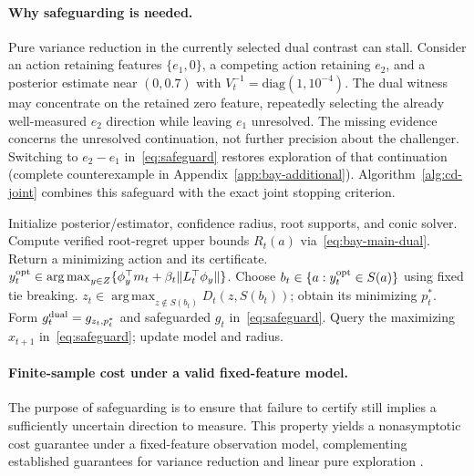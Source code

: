 \documentclass{article}
\theoremstyle{plain}
\theoremstyle{definition}
\DeclareMathOperator*{\argmax}{arg\,max}
\begin{document}
\paragraph{Why safeguarding is needed.}
Pure variance reduction in the currently selected dual contrast
can stall. Consider an action retaining features $\{e_1,0\}$,
a competing action retaining $e_2$, and a posterior estimate
near $(0,0.7)$ with $V_t^{-1}=\mathrm{diag}(1,10^{-4})$.
The dual witness may concentrate on the retained zero feature,
repeatedly selecting the already well-measured $e_2$ direction
while leaving $e_1$ unresolved. The missing evidence concerns
the unresolved continuation, not further precision about the
challenger. Switching to $e_2-e_1$ in~\eqref{eq:safeguard}
restores exploration of that continuation (complete counterexample
in Appendix~\ref{app:bay-additional}).
Algorithm~\ref{alg:cd-joint} combines this safeguard with the
exact joint stopping criterion.

\begin{algorithm}[!htbp]
\caption{CD-Joint: contrast-directed root certification}
\label{alg:cd-joint}
\begin{algorithmic}[1]
\STATE Initialize posterior/estimator, confidence radius, root supports, and conic solver.
\LOOP
\STATE Compute verified root-regret upper bounds $R_t(a)$ via~\eqref{eq:bay-main-dual}.
  \STATE Return a minimizing action and its certificate.
\ENDIF
\STATE $y_t^{\rm opt}\in\argmax_{y\in Z}\{\phi_y^\top m_t+\beta_t\|L_t^\top\phi_y\|\}$.
\STATE Choose $b_t\in\{a:y_t^{\rm opt}\in S(a)\}$ using fixed tie breaking.
\STATE $z_t\in\argmax_{z\notin S(b_t)}D_t(z,S(b_t))$; obtain its minimizing $p_t^*$.
\STATE Form $g_t^{\rm dual}=g_{z_t,p_t^*}$ and safeguarded $g_t$ in~\eqref{eq:safeguard}.
\STATE Query the maximizing $x_{t+1}$ in~\eqref{eq:safeguard}; update model and radius.
\ENDLOOP
\end{algorithmic}
\end{algorithm}

\paragraph{Finite-sample cost under a valid fixed-feature model.}
The purpose of safeguarding is to ensure that failure to certify
still implies a sufficiently uncertain direction to measure.
This property yields a nonasymptotic cost guarantee under a
fixed-feature observation model, complementing established
guarantees for variance reduction and linear pure exploration
\citep{bogunovic2016truvar,jedra2020linear}.
\end{document}
